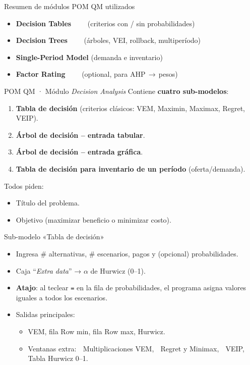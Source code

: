 \documentclass{beamer}
\begin{document}
\begin{frame}{Resumen de módulos POM QM utilizados}
  \begin{itemize}
    \item \textbf{Decision Tables}   (criterios con / sin probabilidades)
    \item \textbf{Decision Trees}   (árboles, VEI, rollback, multiperíodo)
    \item \textbf{Single-Period Model} (demanda e inventario)
    \item \textbf{Factor Rating}   (optional, para AHP\,$\rightarrow$\,pesos)
  \end{itemize}
\end{frame}

\begin{frame}{POM QM · Módulo \textit{Decision Analysis}}
  Contiene \textbf{cuatro sub-modelos}:
  \begin{enumerate}
    \item \textbf{Tabla de decisión} (criterios clásicos: VEM, Maximin, Maximax, Regret, VEIP).
    \item \textbf{Árbol de decisión – entrada tabular}.
    \item \textbf{Árbol de decisión – entrada gráfica}.
    \item \textbf{Tabla de decisión para inventario de un período} (oferta/demanda).
  \end{enumerate}
  Todos piden:
  \begin{itemize}
    \item Título del problema.
    \item Objetivo (maximizar beneficio o minimizar costo).
  \end{itemize}
\end{frame}

\begin{frame}{Sub-modelo «Tabla de decisión»}
  \begin{itemize}
    \item Ingresa \# alternativas, \# escenarios, pagos y (opcional) probabilidades.
    \item Caja “\textit{Extra data}” → $\alpha$ de Hurwicz (0–1).
    \item \textbf{Atajo}: al teclear \texttt{=} en la fila de probabilidades,  
          el programa asigna valores iguales a todos los escenarios.
    \item Salidas principales:
      \begin{itemize}
        \item VEM, fila Row min, fila Row max, Hurwicz.
        \item Ventanas extra:  
               Multiplicaciones VEM,  Regret y Minimax,  VEIP,  Tabla Hurwicz 0–1.
      \end{itemize}
  \end{itemize}
\end{frame}
\end{document}
